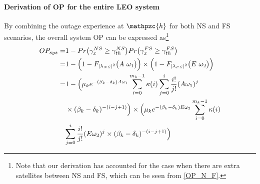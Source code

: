 \documentclass[letter,journal]{IEEEtran}
\begin{document}
\paragraph{\bf Derivation of OP for the entire LEO system} By combining the outage experience at $\mathpzc {h}$ for both NS and FS scenarios, the overall system OP can be expressed as\footnote{Note that our derivation has accounted for the case when there are extra satellites between NS and FS, which can be seen from \eqref{OP_N_F}.}
\begin{align}\label{OP_sys}
     OP_{sys}=&1-Pr\bigl(\gamma_{x}^{NS}\geq\gamma_{th}^{NS} \bigl) Pr\bigl(\gamma_{x}^{FS}\geq\gamma_{th}^{FS}\bigl)\nonumber
        \\=&1-\Big( 1-F_{|\lambda_{NS}|^2}\bigl(A~\omega_1\bigl)\Big)\times \Big( 1-F_{|\lambda_{FS}|^2}\bigl(E~\omega_2\bigl)\Big)\nonumber
        \\ =&1-\Big(  \mu_k  e^{-(\beta_k-\delta_k)A\omega_1} \sum_{i=0}^{m_k-1} \kappa(i)\sum_{j=0}^i \frac{i!}{j!} (A \omega_1)^j \nonumber
         \\&   \times(\beta_k-\delta_k )^{-(i-j+1)}  \Big)  \times\Bigl(\mu_k  e^{-(\beta_k-\delta_k)E\omega_2}\sum_{i=0}^{m_k-1} \kappa(i) \nonumber
         \\& {\sum_{j=0}^i \frac{i!}{j!} (E \omega_2)^j  \times(\beta_k-\delta_k )^{-(i-j+1)} \Bigl)}
\end{align}
\end{document}
